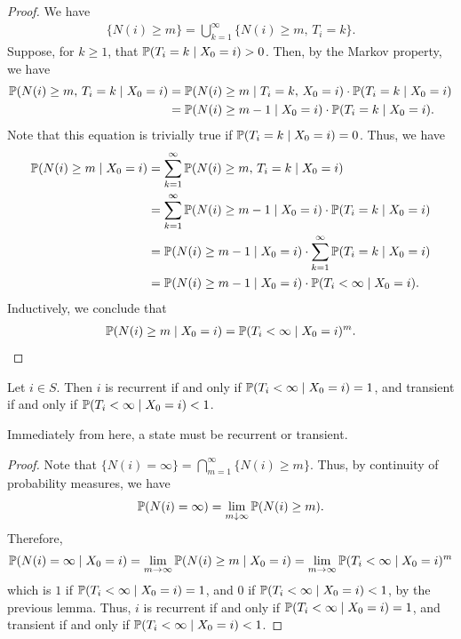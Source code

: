 \begin{proof}
    We have
    \begin{align}
        \{N(i) \geq m\} = \bigcup_{k=1}^{\infty} \{N(i) \geq m, \, T_{i} = k\}.
    \end{align}
    Suppose, for $k \geq 1$, that $\mathbb{P}(T_{i} = k \mid X_{0} = i) > 0$. Then, by the Markov property, we have
    \begin{align}
        \mathbb{P}(N(i) \geq m, \, T_{i} = k \mid X_{0} = i) &= \mathbb{P}(N(i) \geq m \mid T_{i} = k, \, X_{0} = i) \cdot \mathbb{P}(T_{i} = k \mid X_{0} = i) \notag \\ &= \mathbb{P}(N(i) \geq m-1 \mid X_{0} = i) \cdot \mathbb{P}(T_{i} = k \mid X_{0} = i).
    \end{align}
    Note that this equation is trivially true if $\mathbb{P}(T_{i} = k \mid X_{0} = i) = 0$. Thus, we have
    \begin{align}
        \mathbb{P}(N(i) \geq m \mid X_{0} = i)
        &= \sum_{k=1}^{\infty} \mathbb{P}(N(i) \geq m, \, T_{i} = k \mid X_{0} = i) \notag \\
        &= \sum_{k=1}^{\infty} \mathbb{P}(N(i) \geq m-1 \mid X_{0} = i) \cdot \mathbb{P}(T_{i} = k \mid X_{0} = i) \notag \\
        &= \mathbb{P}(N(i) \geq m-1 \mid X_{0} = i) \cdot \sum_{k=1}^{\infty} \mathbb{P}(T_{i} = k \mid X_{0} = i) \notag \\
        &= \mathbb{P}(N(i) \geq m-1 \mid X_{0} = i) \cdot \mathbb{P}(T_{i} < \infty \mid X_{0} = i).
    \end{align}
    Inductively, we conclude that
    \begin{align}
        \mathbb{P}(N(i) \geq m \mid X_{0} = i) = \mathbb{P}(T_{i} < \infty \mid X_{0} = i)^{m}.
    \end{align}
\end{proof}

\begin{proposition}
    Let $i \in S$. Then $i$ is recurrent if and only if $\mathbb{P}(T_{i} < \infty \mid X_{0} = i) = 1$, and transient if and only if $\mathbb{P}(T_{i} < \infty \mid X_{0} = i) < 1$.
\end{proposition}
Immediately from here, a state must be recurrent or transient.
\begin{proof}
    Note that $\{N(i) = \infty\} = \bigcap_{m=1}^{\infty} \{N(i) \geq m\}$. Thus, by continuity of probability measures, we have
    \begin{align}
        \mathbb{P}(N(i) = \infty) = \lim_{m \downarrow \infty} \mathbb{P}(N(i) \geq m).
    \end{align}
    Therefore,
    \begin{align}
        \mathbb{P}(N(i) = \infty \mid X_{0} = i) = \lim_{m \to \infty} \mathbb{P}(N(i) \geq m \mid X_{0} = i) = \lim_{m \to \infty} \mathbb{P}(T_{i} < \infty \mid X_{0} = i)^{m}
    \end{align}
    which is $1$ if $\mathbb{P}(T_{i} < \infty \mid X_{0} = i) = 1$, and $0$ if $\mathbb{P}(T_{i} < \infty \mid X_{0} = i) < 1$, by the previous lemma. Thus, $i$ is recurrent if and only if $\mathbb{P}(T_{i} < \infty \mid X_{0} = i) = 1$, and transient if and only if $\mathbb{P}(T_{i} < \infty \mid X_{0} = i) < 1$.
\end{proof}

